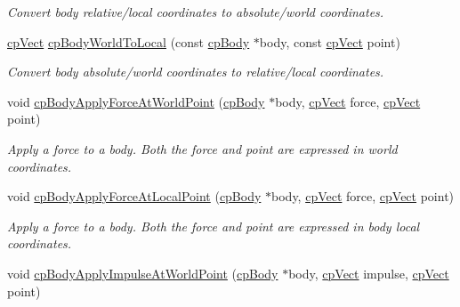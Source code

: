 \begin{DoxyCompactItemize}
\begin{DoxyCompactList}\small\item\em Convert body relative/local coordinates to absolute/world coordinates. \end{DoxyCompactList}\item 
\hypertarget{group__cp_body_ga835570e89bdebb2059827e52c25354fd}{}\hyperlink{structcp_vect}{cp\+Vect} \hyperlink{group__cp_body_ga835570e89bdebb2059827e52c25354fd}{cp\+Body\+World\+To\+Local} (const \hyperlink{structcp_body}{cp\+Body} $\ast$body, const \hyperlink{structcp_vect}{cp\+Vect} point)\label{group__cp_body_ga835570e89bdebb2059827e52c25354fd}

\begin{DoxyCompactList}\small\item\em Convert body absolute/world coordinates to relative/local coordinates. \end{DoxyCompactList}\item 
\hypertarget{group__cp_body_gae3e667ba520cd6372a3f1264a6be6d35}{}void \hyperlink{group__cp_body_gae3e667ba520cd6372a3f1264a6be6d35}{cp\+Body\+Apply\+Force\+At\+World\+Point} (\hyperlink{structcp_body}{cp\+Body} $\ast$body, \hyperlink{structcp_vect}{cp\+Vect} force, \hyperlink{structcp_vect}{cp\+Vect} point)\label{group__cp_body_gae3e667ba520cd6372a3f1264a6be6d35}

\begin{DoxyCompactList}\small\item\em Apply a force to a body. Both the force and point are expressed in world coordinates. \end{DoxyCompactList}\item 
\hypertarget{group__cp_body_gaf8f9ac7d9bd5be760dbfbf2bbd6bff1f}{}void \hyperlink{group__cp_body_gaf8f9ac7d9bd5be760dbfbf2bbd6bff1f}{cp\+Body\+Apply\+Force\+At\+Local\+Point} (\hyperlink{structcp_body}{cp\+Body} $\ast$body, \hyperlink{structcp_vect}{cp\+Vect} force, \hyperlink{structcp_vect}{cp\+Vect} point)\label{group__cp_body_gaf8f9ac7d9bd5be760dbfbf2bbd6bff1f}

\begin{DoxyCompactList}\small\item\em Apply a force to a body. Both the force and point are expressed in body local coordinates. \end{DoxyCompactList}\item 
\hypertarget{group__cp_body_ga0f11b7fd0b8d1d084bdbb6cc1e15026f}{}void \hyperlink{group__cp_body_ga0f11b7fd0b8d1d084bdbb6cc1e15026f}{cp\+Body\+Apply\+Impulse\+At\+World\+Point} (\hyperlink{structcp_body}{cp\+Body} $\ast$body, \hyperlink{structcp_vect}{cp\+Vect} impulse, \hyperlink{structcp_vect}{cp\+Vect} point)\label{group__cp_body_ga0f11b7fd0b8d1d084bdbb6cc1e15026f}


\end{DoxyCompactItemize}
